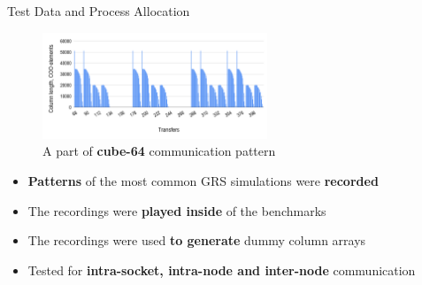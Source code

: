 \begin{frame}[t]{Test Data and Process Allocation}

    \justifying
    \small
   
     \begin{figure}[t]
        \centering
        \includegraphics[width=0.6\textwidth]{figures/chapter-3/communication-pattern.png}
        \caption{A part of \textbf{cube-64} communication pattern}
    \end{figure}

    \vspace{-20.0pt}
    \begin{itemize}
        \item \textbf{Patterns} of the most common GRS simulations were \textbf{recorded}
    
        \item The recordings were \textbf{played inside} of the benchmarks
    
        \item The recordings were used \textbf{to generate} dummy column arrays
    
        \item Tested for \textbf{intra-socket, intra-node and inter-node} communication
    
    \end{itemize}

\end{frame}
\fi

